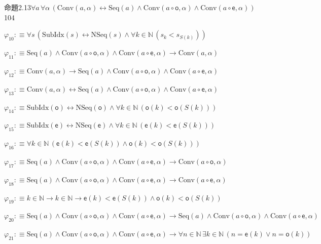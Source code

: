 \begin{fullproof}{命題2.13}{$\forall a\,\forall \alpha\,(\mathrm{Conv}(a,\alpha) \leftrightarrow \mathrm{Seq}(a) \land \mathrm{Conv}(a \circ \mathsf{o},\alpha) \land \mathrm{Conv}(a \circ \mathsf{e},\alpha))$}{104}
\begin{abbrevlist}
\item $\varphi_{10} :\equiv \forall s\,(\mathrm{SubIdx}(s) \leftrightarrow \mathrm{NSeq}(s) \land \forall k \in \mathbb{N}\,(s_{k} < s_{S(k)}))$
\item $\varphi_{11} :\equiv \mathrm{Seq}(a) \land \mathrm{Conv}(a \circ \mathsf{o},\alpha) \land \mathrm{Conv}(a \circ \mathsf{e},\alpha) \to \mathrm{Conv}(a,\alpha)$
\item $\varphi_{12} :\equiv \mathrm{Conv}(a,\alpha) \to \mathrm{Seq}(a) \land \mathrm{Conv}(a \circ \mathsf{o},\alpha) \land \mathrm{Conv}(a \circ \mathsf{e},\alpha)$
\item $\varphi_{13} :\equiv \mathrm{Conv}(a,\alpha) \leftrightarrow \mathrm{Seq}(a) \land \mathrm{Conv}(a \circ \mathsf{o},\alpha) \land \mathrm{Conv}(a \circ \mathsf{e},\alpha)$
\item $\varphi_{14} :\equiv \mathrm{SubIdx}(\mathsf{o}) \leftrightarrow \mathrm{NSeq}(\mathsf{o}) \land \forall k \in \mathbb{N}\,(\mathsf{o}(k) < \mathsf{o}(S(k)))$
\item $\varphi_{15} :\equiv \mathrm{SubIdx}(\mathsf{e}) \leftrightarrow \mathrm{NSeq}(\mathsf{e}) \land \forall k \in \mathbb{N}\,(\mathsf{e}(k) < \mathsf{e}(S(k)))$
\item $\varphi_{16} :\equiv \forall k \in \mathbb{N}\,(\mathsf{e}(k) < \mathsf{e}(S(k)) \land \mathsf{o}(k) < \mathsf{o}(S(k)))$
\item $\varphi_{17} :\equiv \mathrm{Seq}(a) \land \mathrm{Conv}(a \circ \mathsf{o},\alpha) \land \mathrm{Conv}(a \circ \mathsf{e},\alpha) \to \mathrm{Conv}(a \circ \mathsf{o},\alpha)$
\item $\varphi_{18} :\equiv \mathrm{Seq}(a) \land \mathrm{Conv}(a \circ \mathsf{o},\alpha) \land \mathrm{Conv}(a \circ \mathsf{e},\alpha) \to \mathrm{Conv}(a \circ \mathsf{e},\alpha)$
\item $\varphi_{19} :\equiv k \in \mathbb{N} \to k \in \mathbb{N} \to \mathsf{e}(k) < \mathsf{e}(S(k)) \land \mathsf{o}(k) < \mathsf{o}(S(k))$
\item $\varphi_{20} :\equiv \mathrm{Seq}(a) \land \mathrm{Conv}(a \circ \mathsf{o},\alpha) \land \mathrm{Conv}(a \circ \mathsf{e},\alpha) \to \mathrm{Seq}(a) \land \mathrm{Conv}(a \circ \mathsf{o},\alpha) \land \mathrm{Conv}(a \circ \mathsf{e},\alpha)$
\item $\varphi_{21} :\equiv \mathrm{Seq}(a) \land \mathrm{Conv}(a \circ \mathsf{o},\alpha) \land \mathrm{Conv}(a \circ \mathsf{e},\alpha) \to \forall n \in \mathbb{N}\,\exists k \in \mathbb{N}\,(n = \mathsf{e}(k) \lor n = \mathsf{o}(k))$

\end{abbrevlist}
\end{fullproof}
